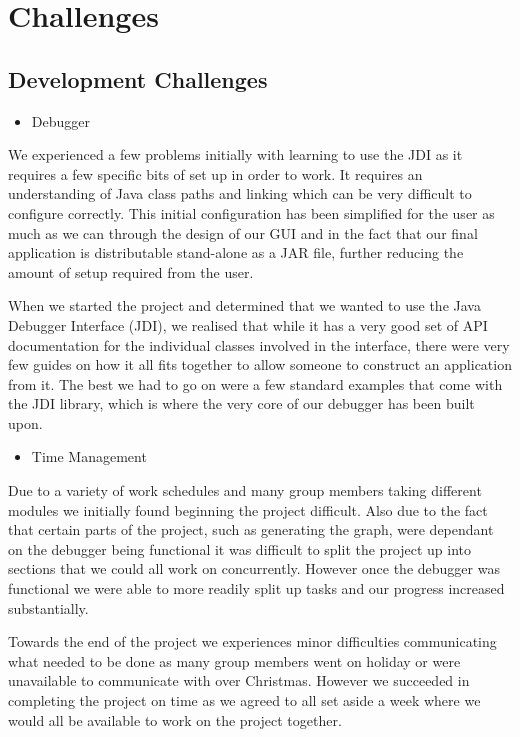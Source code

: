 \documentclass[11pt, a4paper]{report}
\begin{document}
\chapter{Challenges}

\section{Development Challenges}

\begin{itemize}
  \item Debugger
\end{itemize}

We experienced a few problems initially with learning to use the JDI as it requires a few specific bits of set up in order to work. It requires an understanding of Java class paths and linking which can be very difficult to configure correctly. This initial configuration has been simplified for the user as much as we can through the design of our GUI and in the fact that our final application is distributable stand-alone as a JAR file, further reducing the amount of setup required from the user.

When we started the project and determined that we wanted to use the Java Debugger Interface (JDI), we realised that while it has a very good set of API documentation for the individual classes involved in the interface, there were very few guides on how it all fits together to allow someone to construct an application from it. The best we had to go on were a few standard examples that come with the JDI library, which is where the very core of our debugger has been built upon.

\begin{itemize}
  \item Time Management
\end{itemize}

Due to a variety of work schedules and many group members taking different modules we initially found beginning the project difficult. Also due to the fact that certain parts of the project, such as generating the graph, were dependant on the debugger being functional it was difficult to split the project up into sections that we could all work on concurrently. However once the debugger was functional we were able to more readily split up tasks and our progress increased substantially.

Towards the end of the project we experiences minor difficulties communicating what needed to be done as many group members went on holiday or were unavailable to communicate with over Christmas. However we succeeded in completing the project on time as we agreed to all set aside a week where we would all be available to work on the project together.
\end{document}
